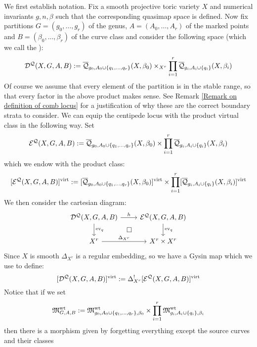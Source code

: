 We first establish notation. Fix a smooth projective toric variety $X$ and numerical invariants $g,n,\beta$ such that the corresponding quasimap space is defined. Now fix partitions $G=(g_0,\ldots,g_r)$ of the genus, $A=(A_0,\ldots,A_r)$ of the marked points and $B=(\beta_0, \ldots, \beta_r)$ of the curve class and consider the following space (which we call the ):
\begin{equation*} \mathcal{D^Q}(X,G,A,B) := \overline{\mathcal Q}_{g_0,A_0 \cup \{ q_1, \ldots, q_r \}}(X,\beta_0) \times_{X^r} \prod_{i=1}^r \overline{\mathcal Q}_{g_i,A_i\cup\{q_i\}}(X,\beta_i) \end{equation*}
Of course we assume that every element of the partition is in the stable range, so that every factor in the above product makes sense. See Remark \ref{Remark on definition of comb locus} for a justification of why these are the correct boundary strata to consider. We can equip the centipede locus with the product virtual class in the following way. Set
\begin{equation*} \mathcal{E^Q}(X,G,A,B) :=  \overline{\mathcal Q}_{g_0,A_0 \cup \{ q_1, \ldots, q_r \}}(X,\beta_0) \times \prod_{i=1}^r \overline{\mathcal Q}_{g_i,A_i\cup\{q_i\}}(X,\beta_i) \end{equation*}
which we endow with the product class:
\begin{equation*} [\mathcal{E^Q}(X,G,A,B)]^{\operatorname{virt}} := [\overline{\mathcal Q}_{g_0,A_0 \cup \{ q_1, \ldots, q_r \}}(X,\beta_0)]^{\operatorname{virt}} \times \prod_{i=1}^r [\overline{\mathcal Q}_{g_i,A_i\cup\{q_i\}}(X,\beta_i)]^{\operatorname{virt}} \end{equation*}
We then consider the cartesian diagram:
\begin{equation} \label{Product diagram}
\begin{tikzcd}
\D{X}{G,A}{B} \ar[r,"h"] \ar[d,"\ev_q"] \ar[rd,phantom,"\square"] & \E{X}{G,A}{B} \ar[d,"\ev_q"] \\
X^r \ar[r,"\Delta_{X^r}"] & X^r \times X^r
\end{tikzcd}
\end{equation}
Since $X$ is smooth $\Delta_{X^r}$ is a regular embedding, so we have a Gysin map which we use to define:
\begin{equation*} [\mathcal{D^Q}(X,G,A,B)]^{\operatorname{virt}} := \Delta_{X^r}^! [\mathcal{E^Q}(X,G,A,B)]^{\operatorname{virt}} \end{equation*}
Notice that if we set
\begin{equation*} \mathfrak M_{G,A,B}^{\operatorname{wt}} := \mathfrak M_{g_0,A_0\cup\{q_1,\ldots,q_r\},\beta_0}^{\operatorname{wt}} \times \prod_{i=1}^r \mathfrak M_{g_i,A_i\cup\{q_i\},\beta_i}^{\operatorname{wt}} \end{equation*}
then there is a morphism given by forgetting everything except the source curves and their classes
